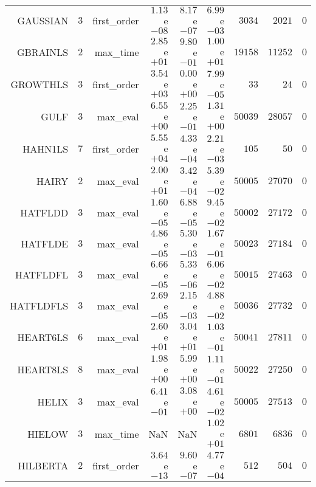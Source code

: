 \begin{longtable}{rrrrrrrrr}
GAUSSIAN & \(     3\) & first\_order & \( 1.13\)e\(-08\) & \( 8.17\)e\(-07\) & \( 6.99\)e\(-03\) & \(  3034\) & \(  2021\) & \(     0\) \\
GBRAINLS & \(     2\) & max\_time & \( 2.85\)e\(+01\) & \( 9.80\)e\(-01\) & \( 1.00\)e\(+01\) & \( 19158\) & \( 11252\) & \(     0\) \\
GROWTHLS & \(     3\) & first\_order & \( 3.54\)e\(+03\) & \( 0.00\)e\(+00\) & \( 7.99\)e\(-05\) & \(    33\) & \(    24\) & \(     0\) \\
GULF & \(     3\) & max\_eval & \( 6.55\)e\(+00\) & \( 2.25\)e\(-01\) & \( 1.31\)e\(+00\) & \( 50039\) & \( 28057\) & \(     0\) \\
HAHN1LS & \(     7\) & first\_order & \( 5.55\)e\(+04\) & \( 4.33\)e\(-04\) & \( 2.21\)e\(-03\) & \(   105\) & \(    50\) & \(     0\) \\
HAIRY & \(     2\) & max\_eval & \( 2.00\)e\(+01\) & \( 3.42\)e\(-04\) & \( 5.39\)e\(-02\) & \( 50005\) & \( 27070\) & \(     0\) \\
HATFLDD & \(     3\) & max\_eval & \( 1.60\)e\(-05\) & \( 6.88\)e\(-05\) & \( 9.45\)e\(-02\) & \( 50002\) & \( 27172\) & \(     0\) \\
HATFLDE & \(     3\) & max\_eval & \( 4.86\)e\(-05\) & \( 5.30\)e\(-03\) & \( 1.67\)e\(-01\) & \( 50023\) & \( 27184\) & \(     0\) \\
HATFLDFL & \(     3\) & max\_eval & \( 6.66\)e\(-05\) & \( 5.33\)e\(-06\) & \( 6.06\)e\(-02\) & \( 50015\) & \( 27463\) & \(     0\) \\
HATFLDFLS & \(     3\) & max\_eval & \( 2.69\)e\(-05\) & \( 2.15\)e\(-03\) & \( 4.88\)e\(-02\) & \( 50036\) & \( 27732\) & \(     0\) \\
HEART6LS & \(     6\) & max\_eval & \( 2.60\)e\(+01\) & \( 3.04\)e\(+01\) & \( 1.03\)e\(-01\) & \( 50041\) & \( 27811\) & \(     0\) \\
HEART8LS & \(     8\) & max\_eval & \( 1.98\)e\(+00\) & \( 5.99\)e\(+00\) & \( 1.11\)e\(-01\) & \( 50022\) & \( 27250\) & \(     0\) \\
HELIX & \(     3\) & max\_eval & \( 6.41\)e\(-01\) & \( 3.08\)e\(+00\) & \( 4.61\)e\(-02\) & \( 50005\) & \( 27513\) & \(     0\) \\
HIELOW & \(     3\) & max\_time &       NaN &       NaN & \( 1.02\)e\(+01\) & \(  6801\) & \(  6836\) & \(     0\) \\
HILBERTA & \(     2\) & first\_order & \( 3.64\)e\(-13\) & \( 9.60\)e\(-07\) & \( 4.77\)e\(-04\) & \(   512\) & \(   504\) & \(     0\) \\

\end{longtable}
